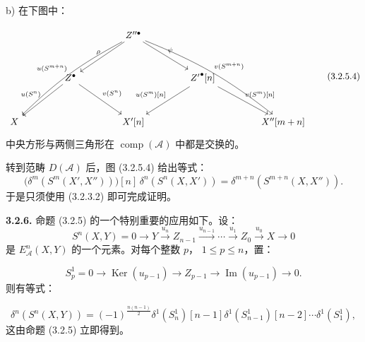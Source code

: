 \clearpage
{}%
\begingroup\small\setlength{\parskip}{0pt}\setlength{\emergencystretch}{1.5em}
\setlength{\abovedisplayskip}{4pt plus 2pt minus 2pt}%
\setlength{\belowdisplayskip}{4pt plus 2pt minus 2pt}%

\noindent b) 在下图中：

\begin{equation}
\resizebox{0.96\textwidth}{!}{%
$\begin{tikzcd}[ampersand replacement=\&,column sep=4.1em,row sep=3.0em]
\&\& Z''^\bullet
  \arrow[ddll,bend right=8,"{u(S^{m+n})}"']
  \arrow[dl,"\rho"']
  \arrow[dr,"\psi"]
  \arrow[ddrr,bend left=8,"{v(S^{m+n})}"]
\&\& \\
\& Z^\bullet
  \arrow[dl,"{u(S^n)}"']
  \arrow[dr,"{v(S^n)}"]
\&\& {Z'}^\bullet[n]
  \arrow[dl,"{u(S^m)[n]}"']
  \arrow[dr,"{v(S^m)[n]}"]
\& \\
X \&\& X'[n] \&\& X''[m+n]
\end{tikzcd}$%
}
\tag{3.2.5.4}
\end{equation}
中央方形与两侧三角形在 $\operatorname{comp}(\mathcal A)$ 中都是交换的。

转到范畴 $D(\mathcal A)$ 后，图 (3.2.5.4) 给出等式：
\[
\bigl(\delta^m(S^m(X',X''))\bigr)[n]\,
\delta^n(S^n(X,X'))
=\delta^{m+n}(S^{m+n}(X,X'')).
\]
于是只须使用 (3.2.3.2) 即可完成证明。

\medskip\noindent\textbf{3.2.6.}\quad
命题 (3.2.5) 的一个特别重要的应用如下。设：
\[
S^n(X,Y)=0\longrightarrow Y\xrightarrow{u_n}Z_{n-1}
\xrightarrow{u_{n-1}}\cdots\xrightarrow{u_1}Z_0
\xrightarrow{u_0}X\longrightarrow0
\]
是 $E_{\mathcal A}^{n}(X,Y)$ 的一个元素。对每个整数 $p$，
$1\leq p\leq n$，置：

\begin{equation}
S_p^1=0\longrightarrow\operatorname{Ker}(u_{p-1})
\longrightarrow Z_{p-1}\longrightarrow\operatorname{Im}(u_{p-1})
\longrightarrow0.
\tag{3.2.6.1}
\end{equation}
则有等式：

\begin{equation}
\delta^n(S^n(X,Y))=(-1)^{\frac{n(n-1)}2}
\delta^1(S_n^1)[n-1]\delta^1(S_{n-1}^1)[n-2]\cdots
\delta^1(S_1^1),
\tag{3.2.6.2}
\end{equation}
这由命题 (3.2.5) 立即得到。

